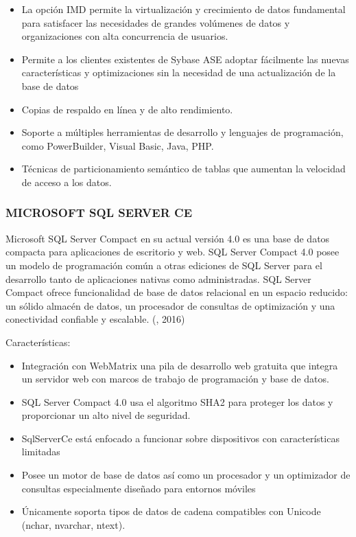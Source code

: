\begin{itemize}

\item La opción IMD permite la virtualización y crecimiento de datos fundamental para satisfacer las necesidades de grandes volúmenes de datos y organizaciones con alta concurrencia de usuarios.

\item Permite a los clientes existentes de Sybase ASE adoptar fácilmente las nuevas características y optimizaciones sin la necesidad de una actualización de la base de datos

\item Copias de respaldo en línea y de alto rendimiento. 

\item Soporte a múltiples herramientas de desarrollo y lenguajes de programación, como PowerBuilder, Visual Basic, Java, PHP.

\item Técnicas de particionamiento semántico de tablas que aumentan la velocidad de acceso a los datos. 

\end{itemize}


\subsubsection{MICROSOFT SQL SERVER CE}
\setlength{\parskip}{5mm}

Microsoft SQL Server Compact en su actual versión 4.0 es una base de datos compacta para aplicaciones de escritorio y web. SQL Server Compact 4.0 posee un modelo de programación común a otras ediciones de SQL Server para el desarrollo tanto de aplicaciones nativas como administradas. SQL Server Compact ofrece funcionalidad de base de datos relacional en un espacio reducido: un sólido almacén de datos, un procesador de consultas de optimización y una conectividad confiable y escalable. (\citet{sqlservercebib}, 2016) 

Características:
\setlength{\parskip}{0mm}

\begin{itemize}

\item Integración con WebMatrix una pila de desarrollo web gratuita que integra un servidor web con marcos de trabajo de programación y base de datos.

\item SQL Server Compact 4.0 usa el algoritmo SHA2 para proteger los datos y proporcionar un alto nivel de seguridad. 

\item SqlServerCe está enfocado a funcionar sobre dispositivos con características limitadas

\item Posee un motor de base de datos así como un procesador y un optimizador de consultas especialmente diseñado para entornos móviles

\item Únicamente soporta tipos de datos de cadena compatibles con Unicode (nchar, nvarchar, ntext). 

\end{itemize}

